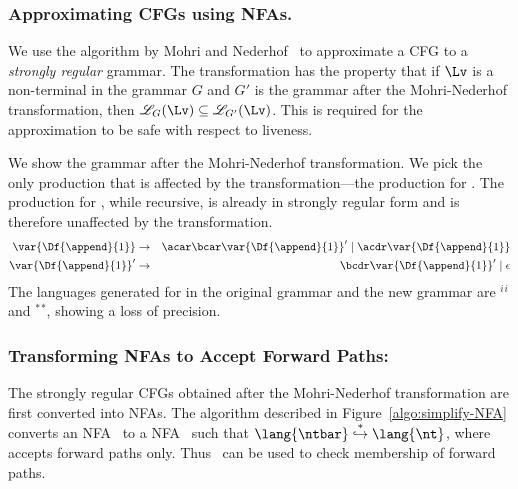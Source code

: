 \documentclass{llncs}
\begin{document}
\subsubsection{Approximating CFGs using NFAs.}
\label{sec:NFA-approx}

We use the   
algorithm  by  Mohri  and Nederhof~\cite{mohri00regular}   to
approximate a CFG  to a   {\em strongly regular\/} grammar.  The
transformation has  the  property that  if $\Lv$  is a
non-terminal  in the grammar  $G$ and  $G'$ is  the grammar  after the
Mohri-Nederhof transformation, then  ${\mathscr L}_G(\Lv) \subseteq {\mathscr
  L}_{G'}(\Lv)$.    This  is   required  for the
approximation to be safe with respect to liveness.

We show the  grammar after the Mohri-Nederhof
transformation. We  pick the only production that  is affected by
the transformation---the production for .  The
production for , while  recursive, is already in
strongly  regular  form  and   is  therefore  unaffected  by  the
transformation.
 \begin{eqnarray*}
  \var{\Df{\append}{1}}
  &\rightarrow&               \acar\bcar \var{\Df{\append}{1}}'  \mid
  \acdr\var{\Df{\append}{1}} \\ 
\var{\Df{\append}{1}}'  &\rightarrow&   \bcdr\var{\Df{\append}{1}}'
\mid \epsilon 
\end{eqnarray*}
The  languages
generated for   in  the original grammar  and the
new       grammar      are       \acdr$^i$\acar\bcar\bcdr$^i$      and
\acdr$^*$\acar\bcar\bcdr$^*$, showing a  loss of  precision.
 


\subsubsection{Transforming NFAs to Accept Forward Paths:}
The strongly regular CFGs obtained after the Mohri-Nederhof
transformation are
  first converted  into  NFAs.  The        algorithm         described        in
Figure~\ref{algo:simplify-NFA} converts  an NFA \ntbar\  to a NFA
\nt\ such that  $\lang{\ntbar} \stackrel{*}{\hookrightarrow} \lang{\nt}$, where {\nt} accepts forward paths only.
Thus  \nt\  can  be  used  to  check  
membership of forward paths.
\end{document}
